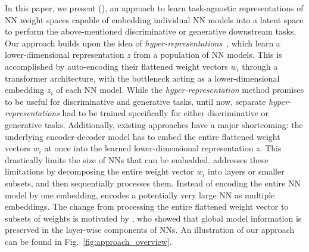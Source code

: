 %
%
In this paper, we present \ourmethodlong (\ourmethod), an approach to learn task-agnostic representations of NN weight spaces capable of embedding individual NN models into a latent space to perform the above-mentioned discriminative or generative downstream tasks.
%
Our approach builds upon the idea of 
\textit{hyper-representations}~\citep{schurholtSelfSupervisedRepresentationLearning2021, schurholtHyperRepresentationsGenerativeModels2022}, which learn a lower-dimensional representation $z$ from a population of NN models. 
This is accomplished by auto-encoding their flattened weight vectors $w_i$ through a transformer architecture, with the bottleneck acting as a lower-dimensional embedding $z_i$ of each NN model. 
While the \textit{hyper-representation} method promises to be useful for discriminative and generative tasks, until now, separate \textit{hyper-representations} had to be trained specifically for either discriminative or generative tasks. 
Additionally, existing approaches have a major shortcoming: the underlying encoder-decoder model has to embed the entire flattened weight vectors $w_i$ at once into the learned lower-dimensional representation $z$. 
%
This drastically limits the size of NNs that can be embedded.
\ourmethod addresses these limitations by decomposing the entire weight vector $w_i$ into layers or smaller subsets, and then sequentially processes them. 
Instead of encoding the entire NN model by one embedding, \ourmethod encodes a potentially very large NN as multiple embeddings. 
%
The change from processing the entire flattened weight vector to subsets of weights is motivated by \citet{martinRethinkingGeneralizationRequires2019,martinImplicitSelfregularizationDeep2021}, who showed that global model information is preserved in the layer-wise components of NNs. 
An illustration of our approach can be found in Fig.~\ref{fig:approach_overview}.

